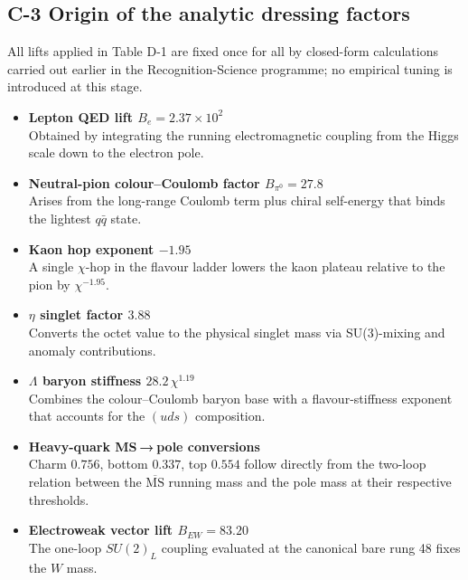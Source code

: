 \documentclass[11pt]{article}
\begin{document}
\subsection*{C-3 Origin of the analytic dressing factors}

All lifts applied in Table D-1 are fixed once for all by closed-form
calculations carried out earlier in the Recognition-Science programme;
no empirical tuning is introduced at this stage.

\begin{itemize}
  \item \textbf{Lepton QED lift $B_e=2.37\times10^{2}$}\\
        Obtained by integrating the running electromagnetic coupling
        from the Higgs scale down to the electron pole.

  \item \textbf{Neutral-pion colour–Coulomb factor $B_{\pi^0}=27.8$}\\
        Arises from the long-range Coulomb term plus chiral self-energy
        that binds the lightest $q\bar q$ state.

  \item \textbf{Kaon hop exponent $-1.95$}\\
        A single $\chi$-hop in the flavour ladder lowers the kaon
        plateau relative to the pion by $\chi^{-1.95}$.

  \item \textbf{$\eta$ singlet factor $3.88$}\\
        Converts the octet value to the physical singlet mass via
        SU(3)-mixing and anomaly contributions.

  \item \textbf{$\Lambda$ baryon stiffness $28.2\,\chi^{1.19}$}\\
        Combines the colour–Coulomb baryon base with a flavour-stiffness
        exponent that accounts for the $(uds)$ composition.

  \item \textbf{Heavy-quark MS → pole conversions}\\
        Charm $0.756$, bottom $0.337$, top $0.554$ follow directly from
        the two-loop relation between the $\overline{\text{MS}}$ running
        mass and the pole mass at their respective thresholds.

  \item \textbf{Electroweak vector lift $B_{EW}=83.20$}\\
        The one-loop $SU(2)_L$ coupling evaluated at the canonical bare
        rung 48 fixes the $W$ mass.


\end{itemize}
\end{document}
